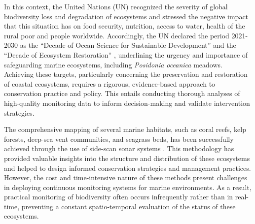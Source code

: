 In this context, the United Nations (UN) recognized the severity of global
biodiversity loss and degradation of ecosystems and stressed the negative
impact that this situation has on food security, nutrition, access to water,
health of the rural poor and people worldwide. Accordingly, the UN declared the
period 2021-2030 as the ``Decade of Ocean Science for Sustainable Development''
and the ``Decade of Ecosystem Restoration'' \cite{UNdecade2000, UNRio},
underlining the urgency and importance of safeguarding marine ecosystems,
including \textit{Posidonia oceanica} meadows. Achieving these targets,
particularly concerning the preservation and restoration of coastal ecosystems,
requires a rigorous, evidence-based approach to
conservation practice and policy. This entails conducting thorough analyses of
high-quality monitoring data to inform decision-making and validate
intervention strategies.

The comprehensive mapping of several marine habitats,
such as coral reefs, kelp forests, deep-sea vent communities, and seagrass
beds, has been successfully achieved through the use of side-scan sonar systems
\cite{Mumby2002, Mishra2006, LeQuilleuc2022, allen-coral-atlas}. This
methodology has provided valuable insights into the structure and distribution
of these ecosystems and helped to design informed conservation strategies and
management practices. However, the cost and time-intensive nature of these
methods present challenges in deploying continuous monitoring systems for
marine environments. As a result, practical monitoring of biodiversity often
occurs infrequently rather than in real-time, preventing a constant
spatio-temporal evaluation of the status of these ecosystems.

